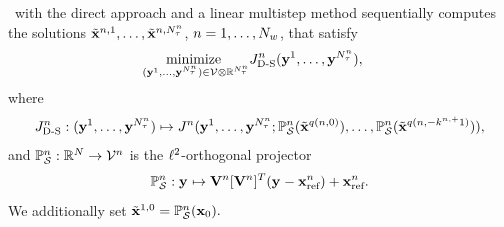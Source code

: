 \methodAcronym\ with the direct approach and a linear multistep method sequentially computes the solutions
$\tilde{\mathbf{x}}^{n,1},\ldots,\tilde{\mathbf{x}}^{n,N_{\tau}^{n}}$,
$n=1,\ldots,N_w$, that satisfy
\begin{align*}
	&\underset{(\mathbf{y}^{1},\ldots,\mathbf{y}^{N_{\tau}^{n}}) \in \mathcal{V }\otimes \mathbb{R}^{N_{\tau}^{n}}}{\text{minimize } }
J^{n}_{\text{D-S}} (\mathbf{y}^{1},\ldots,\mathbf{y}^{N_{\tau}^{n}}), 
\end{align*}
where
$$J^{n}_{\text{D-S}} :  (\mathbf{y}^{1},\ldots,\mathbf{y}^{N_{\tau}^{n}}) \mapsto J^{n}(\mathbf{y}^{1},\ldots,\mathbf{y}^{N_{\tau}^{n}}; \mathbb{P}_{\mathcal{S}}^{n}(\tilde{\mathbf{x}}^{q(n,0)}),\ldots,\mathbb{P}_{\mathcal{S}}^{n}(\tilde{\mathbf{x}}^{q(n,-k^{n,+}1)})),
$$
and $\mathbb{P}_{\mathcal{S}}^{n} : \mathbb{R}^{N} \rightarrow \mathcal{V }^{n}$ is the $\ell^2$-orthogonal projector 
$$\mathbb{P}_{\mathcal{S}}^{n} : \mathbf{y}^{} \mapsto  \mathbf {V}^{n}[\mathbf {V}^{n}]^T (\mathbf{y}^{} - \mathbf{x}_\text{ref}^{n}) + \mathbf{x}_\text{ref}^{n} .$$
We additionally set $\tilde{\mathbf{x}}^{1,0} = \mathbb{P}_{\mathcal{S}}^{n}({{\mathbf{x}}_0}).
$
